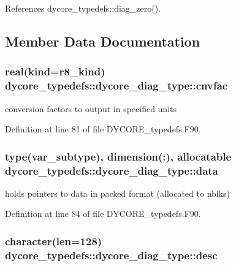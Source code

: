 References dycore\-\_\-typedefs\-::diag\-\_\-zero().



\subsection{Member Data Documentation}
\subsubsection[{cnvfac}]{\setlength{\rightskip}{0pt plus 5cm}real(kind=r8\-\_\-kind) dycore\-\_\-typedefs\-::dycore\-\_\-diag\-\_\-type\-::cnvfac}\label{structdycore__typedefs_1_1dycore__diag__type_ae35b7d0f8874805074bb1e02e05628ac}


conversion factors to output in specified units 



Definition at line 81 of file D\-Y\-C\-O\-R\-E\-\_\-typedefs.\-F90.

\subsubsection[{data}]{\setlength{\rightskip}{0pt plus 5cm}type({\bf var\-\_\-subtype}), dimension(\-:), allocatable dycore\-\_\-typedefs\-::dycore\-\_\-diag\-\_\-type\-::data}\label{structdycore__typedefs_1_1dycore__diag__type_affdbdddebd40e81618410f1312a49c5b}


holds pointers to data in packed format (allocated to nblks) 



Definition at line 84 of file D\-Y\-C\-O\-R\-E\-\_\-typedefs.\-F90.

\subsubsection[{desc}]{\setlength{\rightskip}{0pt plus 5cm}character(len=128) dycore\-\_\-typedefs\-::dycore\-\_\-diag\-\_\-type\-::desc}\label{structdycore__typedefs_1_1dycore__diag__type_ad80ebe3be46ad81d5899d42175361dce}


